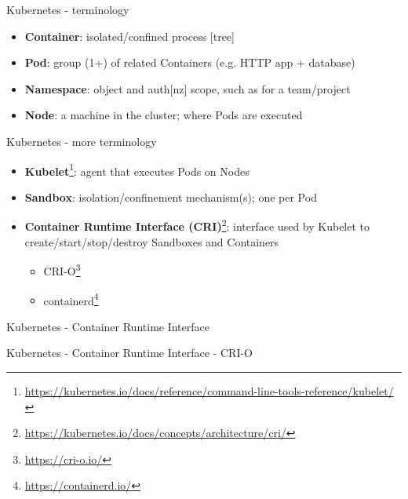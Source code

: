 \documentclass[ignorenonframetext,aspectratio=169,12pt]{beamer}
\def\svgwidth{4cm}
\begin{document}
\begin{frame}{Kubernetes - terminology}
\protect\hypertarget{kubernetes-terminology}{}

\begin{itemize}
\item {\bf Container}: isolated/confined process [tree]
\item {\bf Pod}: group (1+) of related Containers (e.g. HTTP app + database)
\item {\bf Namespace}: object and auth[nz] scope, such as for a team/project
\item {\bf Node}: a machine in the cluster; where Pods are executed
\end{itemize}

\end{frame}

\begin{frame}{Kubernetes - more terminology}
\protect\hypertarget{kubernetes-terminology-2}{}
\begin{itemize}

\item {\bf
  Kubelet}\footnote{\url{https://kubernetes.io/docs/reference/command-line-tools-reference/kubelet/}}:
  agent that executes Pods on Nodes

\item {\bf Sandbox}: isolation/confinement mechanism(s); one per Pod
\item {\bf Container Runtime Interface
  (CRI)}\footnote{\url{https://kubernetes.io/docs/concepts/architecture/cri/}}:
  interface used by Kubelet to create/start/stop/destroy Sandboxes and
  Containers
  \begin{itemize}
  \item CRI-O\footnote{\url{https://cri-o.io/}}
  \item containerd\footnote{\url{https://containerd.io/}}
  \end{itemize}
\end{itemize}
\end{frame}

\begin{frame}{Kubernetes - Container Runtime Interface}
\begin{center}
\def\svgwidth{\textwidth}

\end{center}
\end{frame}

\begin{frame}{Kubernetes - Container Runtime Interface - CRI-O}
\begin{center}
\def\svgwidth{\textwidth}

\end{center}
\end{frame}
\end{document}
